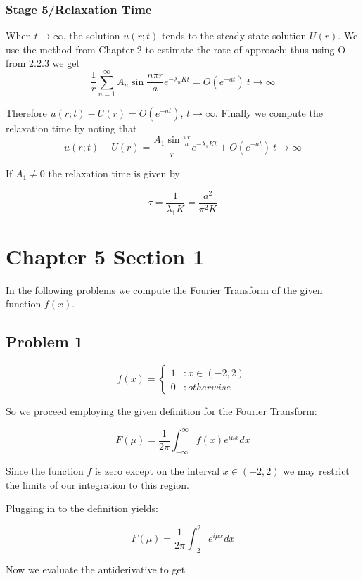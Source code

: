 \documentclass[12pt]{article}
\begin{document}
\subsubsection{Stage 5/Relaxation Time}
When $t\to\infty$, the solution $u(r;t)$ tends to the steady-state solution $U(r)$. We use the method from Chapter 2 to estimate the rate of approach; thus using O from 2.2.3\cite[Page 113]{pinsky} we get
\[\frac{1}{r}\sum_{n=1}^\infty A_n \sin{\frac{n\pi r}{a}} e^{-\lambda_n K t}=O( e^{-a t})\ t\to\infty\]

Therefore $u(r;t)-U(r)=O( e^{-a t})$, $t\to\infty$. Finally we compute the relaxation time by noting that
\[ u(r;t)-U(r)= \frac{ A_1 \sin{\frac{\pi r}{a}}}{r} e^{-\lambda_1 K t}+O( e^{-a t})\ t\to\infty\]

If $A_1 \neq 0$ the relaxation time is given by 

\[\tau=\frac{1}{\lambda_1 K}=\frac{a^2}{\pi^2 K}\]



\section{Chapter 5 Section 1}
In the following problems we compute the Fourier Transform of the given function $f(x)$.
\subsection{Problem 1}

 \begin{displaymath}
   f(x) = \left\{
     \begin{array}{lr}
       1 & : x \in (-2,2)\\
       0 & : otherwise
     \end{array}
   \right.
	\end{displaymath} 


So we proceed employing the given definition for the Fourier Transform\cite[Page 278]{pinsky}:

$$F ( \mu ) = \frac{1}{2\pi} \int_{-\infty}^\infty f(x) e^{i \mu x} dx$$

Since the function $f$ is zero except on the interval $x \in (-2,2)$ we may restrict the limits of our integration to this region. 

Plugging in to the definition yields:

$$F(\mu)=\frac{1}{2\pi}\int_{-2}^2e^{i\mu x}dx$$

Now we evaluate the antiderivative to get
\end{document}
